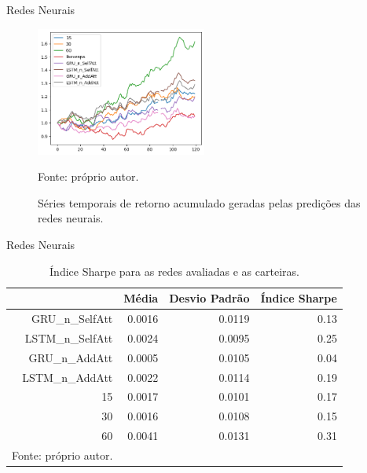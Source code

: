     \begin{frame}{Redes Neurais}

        \begin{figure}[htbp]
            \centering
            \caption{Séries temporais de retorno acumulado geradas pelas predições das redes neurais.}
            \label{fig:backtest_ts}
            \includegraphics[width=0.5\textwidth]{./images/backtest_ts.png}
            \par \footnotesize Fonte: próprio autor.
        \end{figure}


    \end{frame}





    \begin{frame}{Redes Neurais}

        \begin{table}[htbp]
            \centering
            \caption{Índice Sharpe para as redes avaliadas e as carteiras.}
            \label{tab:sharpe}
            \begin{tabular}{rrrr}
                \hline
                & \textbf{Média} & \textbf{Desvio Padrão} & \textbf{Índice Sharpe} \\ \hline \hline
                GRU\_n\_SelfAtt & 0.0016 & 0.0119 & 0.13 \\
                LSTM\_n\_SelfAtt & 0.0024 & 0.0095 & 0.25 \\
                GRU\_n\_AddAtt & 0.0005 & 0.0105 & 0.04 \\
                LSTM\_n\_AddAtt & 0.0022 & 0.0114 & 0.19 \\
                15 & 0.0017 & 0.0101 & 0.17 \\
                30 & 0.0016 & 0.0108 & 0.15 \\
                60 & 0.0041 & 0.0131 & 0.31 \\
                \hline
                \par \footnotesize Fonte: próprio autor.
            \end{tabular}
        \end{table}

    \end{frame}
